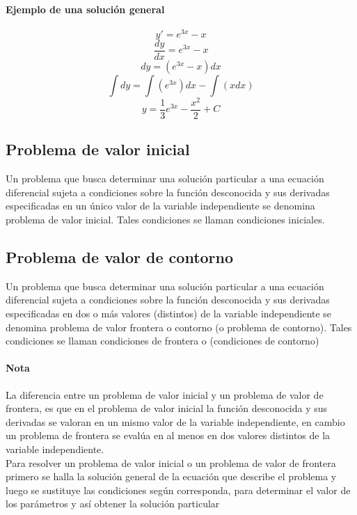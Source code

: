 \documentclass{article}
\begin{document}
\paragraph{Ejemplo de una solución general}\cite{Baz}
\begin{equation}
y'= e^{3x}-x
\end{equation}
\begin{equation}
\frac{dy}{dx}=e^{3x}-x
\end{equation}
\begin{equation}
{dy}=(e^{3x}-x){dx}
\end{equation}
\begin{equation}
\int{dy}=\int(e^{3x}){dx}-\int(x{dx})
\end{equation}
\begin{equation}
y=\frac{1}{3}e^{3x}-\frac{x^{2}}{2} + C
\end{equation}
\subsection{Problema de valor inicial}
Un problema que busca determinar una solución particular a una ecuación diferencial sujeta a condiciones sobre la función desconocida y sus derivadas especificadas en un único valor de la variable independiente se denomina problema de valor inicial. Tales condiciones se llaman condiciones iniciales.
\subsection{Problema de valor de contorno}
Un problema que busca determinar una solución particular a una ecuación diferencial sujeta a condiciones sobre la función desconocida y sus derivadas especificadas en dos o más valores (distintos) de la variable independiente se denomina problema de valor frontera o contorno (o problema de contorno). Tales condiciones se llaman condiciones de frontera o (condiciones de contorno)
\paragraph{Nota}
La diferencia entre un problema de valor inicial y un problema de valor de frontera, es que en el problema de valor inicial la función desconocida y sus derivadas se valoran en un mismo valor de la variable independiente, en cambio un problema de frontera se evalúa en al menos en dos valores distintos de la variable independiente.\\
Para resolver un problema de valor inicial o un problema de valor de frontera primero se halla la solución general de la ecuación que describe el problema y luego se sustituye las condiciones según corresponda, para determinar el valor de los parámetros y así obtener la solución particular
\end{document}
